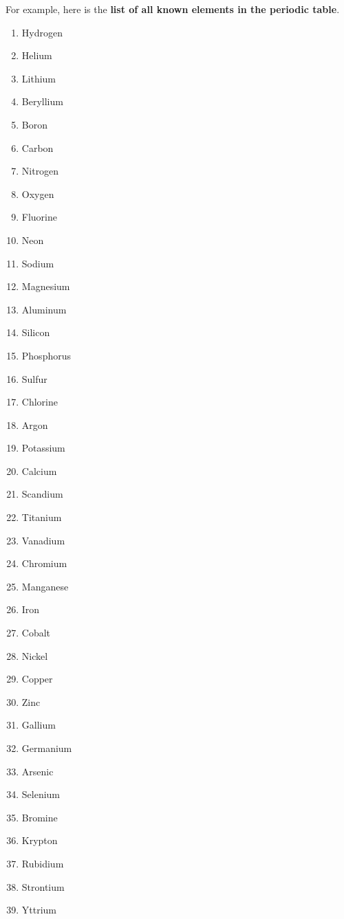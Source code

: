 \begin{enumerate}
    For example, here is the \textbf{list of all known elements in the periodic table}.
    \begin{multicols}{3}
    \begin{enumerate}[label={\thaialphs*.}]
        \item Hydrogen
        \item Helium
        \item Lithium
        \item Beryllium
        \item Boron
        \item Carbon
        \item Nitrogen
        \item Oxygen
        \item Fluorine
        \item Neon
        \item Sodium
        \item Magnesium
        \item Aluminum
        \item Silicon
        \item Phosphorus
        \item Sulfur
        \item Chlorine
        \item Argon
        \item Potassium
        \item Calcium
        \item Scandium
        \item Titanium
        \item Vanadium
        \item Chromium
        \item Manganese
        \item Iron
        \item Cobalt
        \item Nickel
        \item Copper
        \item Zinc
        \item Gallium
        \item Germanium
        \item Arsenic
        \item Selenium
        \item Bromine
        \item Krypton
        \item Rubidium
        \item Strontium
        \item Yttrium

\end{enumerate}
\end{multicols}
\end{enumerate}
